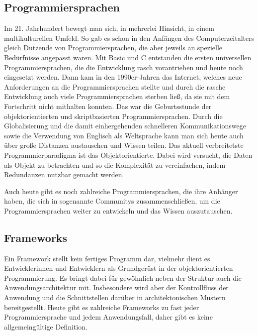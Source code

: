 \subsection{Programmiersprachen}
Im 21. Jahrhundert bewegt man sich, in mehrerlei Hinsicht, in einem multikulturellen 
Umfeld. So gab es schon in den Anfängen des Computerzeitalters gleich Dutzende 
von Programmiersprachen, die aber jeweils an spezielle Bedürfnisse angepasst waren. Mit Basic und C entstanden die ersten universellen
Programmiersprachen, die die Entwicklung rasch vorantrieben und heute 
noch eingesetzt werden. Dann kam in den 1990er-Jahren das Internet, welches neue Anforderungen
an die Programmiersprachen stellte und durch die rasche Entwicklung auch 
viele Programmiersprachen sterben ließ, da sie mit dem Fortschritt 
nicht mithalten konnten. Das war die Geburtsstunde der objektorientierten und skriptbasierten 
Programmiersprachen. Durch die Globalisierung und die damit einhergehenden schnelleren Kommunikationswege sowie die Verwendung von Englisch als Weltsprache kann man sich heute auch über große 
Distanzen austauschen und Wissen teilen. Das aktuell verbreitetste Programmierparadigma ist das Objektorientierte. Dabei wird versucht, die Daten als Objekt zu betrachten und so die 
Komplexität zu vereinfachen, indem Redundanzen nutzbar gemacht werden.

Auch heute gibt es noch zahlreiche Programmiersprachen, die ihre Anhänger
haben, die sich in sogenannte Communitys zusammenschließen, um die 
Programmiersprachen weiter zu entwickeln und das Wissen auszutauschen.

\subsection{Frameworks} 
Ein Framework stellt kein fertiges Programm dar, vielmehr dient es 
Entwicklerinnen und Entwicklern als Grundgerüst in der 
objektorientierten Programmierung. Es bringt dabei für gewöhnlich neben 
der Struktur auch die Anwendungsarchitektur mit. Insbesondere wird 
aber der Kontrollfluss der Anwendung und die Schnittstellen darüber
in architektonischen Mustern bereitgestellt. 
Heute gibt es zahlreiche Frameworks zu fast jeder Programmiersprache und
jedem Anwendungsfall, daher gibt es keine allgemeingültige Definition.   

